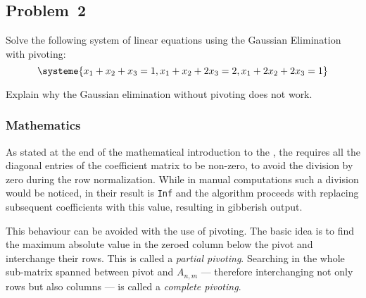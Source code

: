 \subsection{Problem~2}%
\label{sec:problem)2}

Solve the following system of linear equations using the Gaussian Elimination with
pivoting:
\begin{equation*}
    \systeme{x_1+x_2+x_3=1,x_1+x_2+2x_3=2,x_1+2x_2+2x_3=1}
\end{equation*}

Explain why the Gaussian elimination without pivoting does not work.

\subsubsection*{Mathematics}
As stated at the end of the mathematical introduction to the ,
the  requires all the diagonal entries of the coefficient
matrix to be non-zero, to avoid the division by zero during the row normalization.
While in manual computations such a division would be noticed, in \MATLAB their result
is \texttt{Inf} and the algorithm proceeds with replacing subsequent coefficients with
this value, resulting in gibberish output.

This behaviour can be avoided with the use of pivoting. 
The basic idea is to find the maximum absolute value in the zeroed column below the
pivot and interchange their rows.
This is called a \textit{partial pivoting}.
Searching in the whole sub-matrix spanned between pivot and $A_{n,m}$ --- therefore
interchanging not only rows but also columns --- is called a \textit{complete pivoting}.

